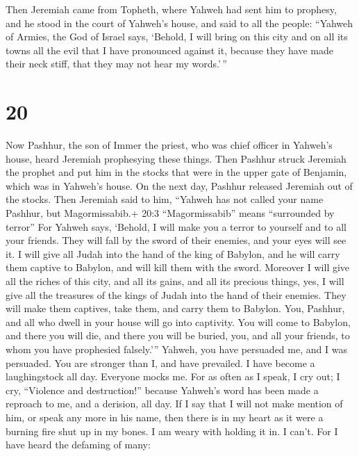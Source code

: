  Then Jeremiah came from Topheth, where Yahweh had sent him
to prophesy, and he stood in the court of Yahweh's house, and said to
all the people:  ``Yahweh of Armies, the God of Israel
says, `Behold, I will bring on this city and on all its towns all the
evil that I have pronounced against it, because they have made their
neck stiff, that they may not hear my words.'\,''

\hypertarget{section-19}{%
\section{20}\label{section-19}}

 Now Pashhur, the son of Immer the priest, who was chief
officer in Yahweh's house, heard Jeremiah prophesying these things.
 Then Pashhur struck Jeremiah the prophet and put him in the
stocks that were in the upper gate of Benjamin, which was in Yahweh's
house.  On the next day, Pashhur released Jeremiah out of
the stocks. Then Jeremiah said to him, ``Yahweh has not called your name
Pashhur, but Magormissabib.+ 20:3 ``Magormissabib'' means ``surrounded
by terror''  For Yahweh says, `Behold, I will make you a
terror to yourself and to all your friends. They will fall by the sword
of their enemies, and your eyes will see it. I will give all Judah into
the hand of the king of Babylon, and he will carry them captive to
Babylon, and will kill them with the sword.  Moreover I will
give all the riches of this city, and all its gains, and all its
precious things, yes, I will give all the treasures of the kings of
Judah into the hand of their enemies. They will make them captives, take
them, and carry them to Babylon.  You, Pashhur, and all who
dwell in your house will go into captivity. You will come to Babylon,
and there you will die, and there you will be buried, you, and all your
friends, to whom you have prophesied falsely.'''  Yahweh,
you have persuaded me, and I was persuaded. You are stronger than I, and
have prevailed. I have become a laughingstock all day. Everyone mocks
me.  For as often as I speak, I cry out; I cry, ``Violence
and destruction!'' because Yahweh's word has been made a reproach to me,
and a derision, all day.  If I say that I will not make
mention of him, or speak any more in his name, then there is in my heart
as it were a burning fire shut up in my bones. I am weary with holding
it in. I can't.  For I have heard the defaming of many:
